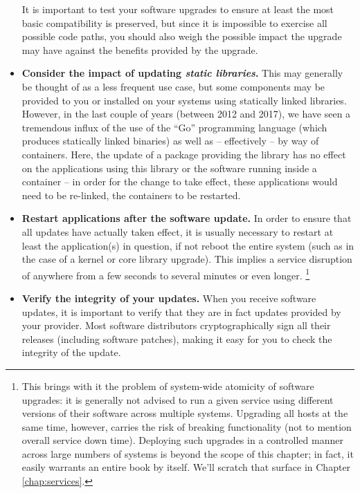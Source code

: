 \begin{itemize}
		It is important to test your software upgrades to ensure
		at least the most basic compatibility is preserved, but
		since it is impossible to exercise all possible code
		paths, you should also weigh the possible impact the
		upgrade may have against the benefits provided by the
		upgrade.

	\item {\bf Consider the impact of updating
		{\em static libraries}.}  This may generally be
		thought of as a less frequent use case, but some
		components may be provided to you or installed on your
		systems using statically linked libraries.  However,
		in the last couple of years (between 2012 and 2017),
		we have seen a tremendous influx of the use of the
		``Go'' programming language (which produces statically
		linked binaries) as well as -- effectively -- by way
		of containers. Here, the update of a package providing
		the library has no effect on the applications using
		this library or the software running inside a
		container -- in order for the change to take effect,
		these applications would need to be re-linked, the
		containers to be restarted.

	\item {\bf Restart applications after the software update.}  In
		order to ensure that all updates have actually taken
		effect, it is usually necessary to restart at least the
		application(s) in question, if not reboot the entire
		system (such as in the case of a kernel or core library
		upgrade).  This implies a service disruption of anywhere
		from a few seconds to several minutes or even longer.
		\footnote{This brings with it the problem of system-wide atomicity
		of software upgrades: it is generally not advised to run a
		given service using different versions of their software
		across multiple systems.  Upgrading all hosts at the same
		time, however, carries the risk of breaking functionality
		(not to mention overall service down time).  Deploying
		such upgrades in a controlled manner across large numbers
		of systems is beyond the scope of this chapter; in fact,
		it easily warrants an entire book by itself.  We'll scratch
		that surface in Chapter \ref{chap:services}.}

	\item {\bf Verify the integrity of your updates.}  When you
		receive software updates, it is important to verify that
		they are in fact updates provided by your provider.  Most
		software distributors cryptographically sign all their releases
		(including software patches), making it easy for you to
		check the integrity of the update.


\end{itemize}

